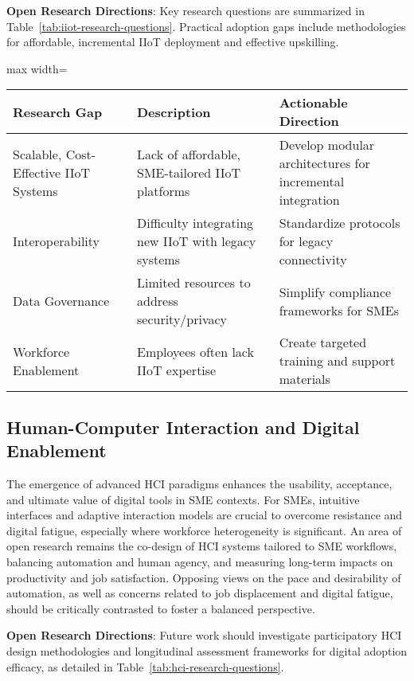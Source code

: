 \documentclass[sigconf]{acmart}
\begin{document}
\textbf{Open Research Directions}: Key research questions are summarized in Table~\ref{tab:iiot-research-questions}. Practical adoption gaps include methodologies for affordable, incremental IIoT deployment and effective upskilling.

\begin{table*}[htbp]
\centering
\caption{Open Research Questions in IIoT Adoption for SMEs}
\label{tab:iiot-research-questions}
\begin{adjustbox}{max width=\textwidth}
\begin{tabular}{@{}lll@{}}
\toprule
Research Gap & Description & Actionable Direction \\
\midrule
Scalable, Cost-Effective IIoT Systems & Lack of affordable, SME-tailored IIoT platforms & Develop modular architectures for incremental integration \\
Interoperability & Difficulty integrating new IIoT with legacy systems & Standardize protocols for legacy connectivity \\
Data Governance & Limited resources to address security/privacy & Simplify compliance frameworks for SMEs \\
Workforce Enablement & Employees often lack IIoT expertise & Create targeted training and support materials \\
\bottomrule
\end{tabular}
\end{adjustbox}
\end{table*}

\subsection{Human-Computer Interaction and Digital Enablement}

The emergence of advanced HCI paradigms enhances the usability, acceptance, and ultimate value of digital tools in SME contexts. For SMEs, intuitive interfaces and adaptive interaction models are crucial to overcome resistance and digital fatigue, especially where workforce heterogeneity is significant. An area of open research remains the co-design of HCI systems tailored to SME workflows, balancing automation and human agency, and measuring long-term impacts on productivity and job satisfaction. Opposing views on the pace and desirability of automation, as well as concerns related to job displacement and digital fatigue, should be critically contrasted to foster a balanced perspective.

\textbf{Open Research Directions}: Future work should investigate participatory HCI design methodologies and longitudinal assessment frameworks for digital adoption efficacy, as detailed in Table~\ref{tab:hci-research-questions}.
\end{document}
